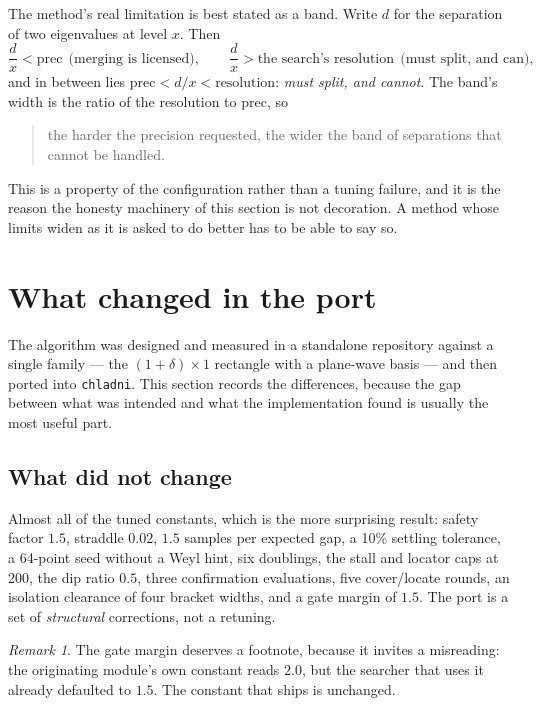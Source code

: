 \documentclass[11pt]{article}
\theoremstyle{definition}
\theoremstyle{remark}
\newtheorem{remark}{Remark}
\newcommand{\code}[1]{\texttt{#1}}
\newcommand{\pr}{\mathrm{prec}}
\begin{document}
The method's real limitation is best stated as a band. Write $d$ for the separation of two
eigenvalues at level $x$. Then
\[
  \frac{d}{x} < \pr \ \ \text{(merging is licensed)},
  \qquad
  \frac{d}{x} > \text{the search's resolution} \ \ \text{(must split, and can)},
\]
and in between lies $\pr < d/x < \text{resolution}$: \emph{must split, and cannot}. The
band's width is the ratio of the resolution to $\pr$, so

\begin{quote}
the harder the precision requested, the wider the band of separations that cannot be handled.
\end{quote}

This is a property of the configuration rather than a tuning failure, and it is the reason the
honesty machinery of this section is not decoration. A method whose limits widen as it is asked
to do better has to be able to say so.

\section{What changed in the port}
\label{sec:port}

The algorithm was designed and measured in a standalone repository against a single family ---
the $(1+\delta)\times1$ rectangle with a plane-wave basis --- and then ported into
\code{chladni}. This section records the differences, because the gap between what was intended
and what the implementation found is usually the most useful part.

\subsection{What did not change}

Almost all of the tuned constants, which is the more surprising result: safety factor $1.5$,
straddle $0.02$, $1.5$ samples per expected gap, a 10\% settling tolerance, a 64-point seed
without a Weyl hint, six doublings, the stall and locator caps at 200, the dip ratio $0.5$,
three confirmation evaluations, five cover/locate rounds, an isolation clearance of four
bracket widths, and a gate margin of $1.5$. The port is a set of \emph{structural} corrections,
not a retuning.

\begin{remark}
The gate margin deserves a footnote, because it invites a misreading: the originating module's
own constant reads $2.0$, but the searcher that uses it already defaulted to $1.5$. The
constant that ships is unchanged.
\end{remark}
\end{document}
